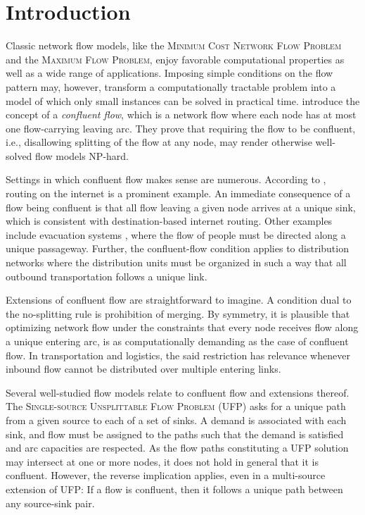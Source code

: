 \documentclass[pdflatex,sn-mathphys-num]{sn-jnl}%
\theoremstyle{thmstyleone}%
\begin{document}
\section{Introduction} \label{intro}

Classic network flow models, like the \textsc{Minimum Cost Network Flow Problem} and the \textsc{Maximum Flow Problem},
enjoy favorable computational properties as well as a wide range of applications.
Imposing simple conditions on the flow pattern may, however,
transform a computationally tractable problem into a model of which only small instances can be solved in practical time.
\citet{chen06} introduce the concept of a \emph{confluent flow}, which is a network flow where each node has at most one flow-carrying leaving arc.
They prove that requiring the flow to be confluent, i.e., disallowing splitting of the flow at any node, may render otherwise well-solved flow models NP-hard.

Settings in which confluent flow makes sense are numerous.
According to \citet{chen06,chen07}, routing on the internet is a prominent example.
An immediate consequence of a flow being confluent is that all flow leaving a given node arrives at a unique sink,
which is consistent with destination-based internet routing.
Other examples include evacuation systems \citep{mamada05}, where the flow of people must be directed along a unique passageway.
Further, the confluent-flow condition applies to distribution networks where the distribution units must be organized in such a way that
all outbound transportation follows a unique link.

Extensions of confluent flow are straightforward to imagine.
A condition dual to the no-splitting rule is prohibition of merging.
By symmetry, it is plausible that optimizing network flow under the constraints that every node receives flow along a unique entering arc,
is as computationally demanding as the case of confluent flow.
In transportation and logistics, the said restriction has relevance whenever inbound flow cannot be distributed over multiple entering links.

Several well-studied flow models relate to confluent flow and extensions thereof.
The \textsc{Single-source Unsplittable Flow Problem} (UFP) \citep{kleinberg96,dinitz99,kolliopoulos02} asks for a unique path from a given source to each of a set of sinks.
A demand is associated with each sink, and flow must be assigned to the paths such that the demand is satisfied and arc capacities are respected.
As the flow paths constituting a UFP solution may intersect at one or more nodes, it does not hold in general that it is confluent.
However, the reverse implication applies, even in a multi-source extension of UFP: If a flow is confluent, then it follows a unique path between any source-sink pair.
\end{document}
